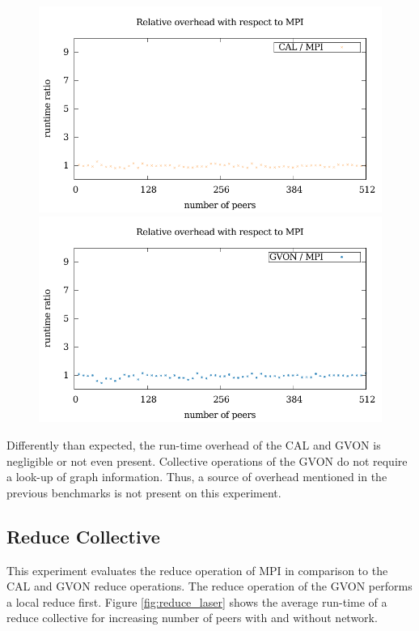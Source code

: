 \begin{figure}[H]
\begin{minipage}[t]{0.5\textwidth}
  \end{minipage}%
  \begin{minipage}[t]{0.5\textwidth}
    \includegraphics[width=\textwidth]{plots/50_collective_network_overhead_cal_laser}
    \includegraphics[width=\textwidth]{plots/50_collective_network_overhead_gvon_laser}
  \end{minipage}%
  \caption{ }
  \label{fig:gather_laser}
\end{figure}

\noindent Differently than expected, the run-time overhead of the CAL
and GVON is negligible or not even present.  Collective operations of
the GVON do not require a look-up of graph information. Thus, a source
of overhead mentioned in the previous benchmarks is not present on
this experiment.

\subsection*{Reduce Collective}
This experiment evaluates the reduce operation of MPI in comparison to
the CAL and GVON reduce operations.  The reduce operation of the GVON
performs a local reduce first.  Figure \ref{fig:reduce_laser} shows
the average run-time of a reduce collective for increasing number of
peers with and without network.

